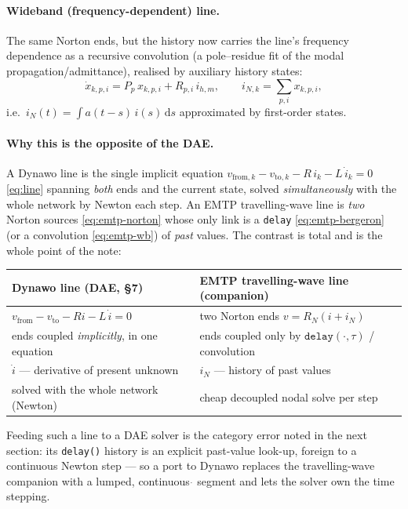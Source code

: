 \documentclass[11pt]{article}
\newcommand{\dd}{\mathrm{d}}
\begin{document}
\paragraph{Wideband (frequency-dependent) line.} The same Norton ends, but the
history now carries the line's frequency dependence as a recursive convolution
(a pole--residue fit of the modal propagation/admittance), realised by auxiliary
history states:
\begin{equation}
\dot x_{k,p,i}=P_{p}\,x_{k,p,i}+R_{p,i}\,i_{h,m},
\qquad
i_{N,k}=\sum_{p,i} x_{k,p,i},
\label{eq:emtp-wb}
\end{equation}
i.e.\ $i_N(t)=\int a(t-s)\,i(s)\,\dd s$ approximated by first-order states.

\paragraph{Why this is the opposite of the DAE.} A Dynawo line is the single
implicit equation $v_{\mathrm{from},k}-v_{\mathrm{to},k}-R\,i_k-L\,\dot i_k=0$
\eqref{eq:line} spanning \emph{both} ends and the current state, solved
\emph{simultaneously} with the whole network by Newton each step. An EMTP
travelling-wave line is \emph{two} Norton sources \eqref{eq:emtp-norton} whose
only link is a \texttt{delay} \eqref{eq:emtp-bergeron} (or a convolution
\eqref{eq:emtp-wb}) of \emph{past} values. The contrast is total and is the whole
point of the note:

\begin{center}\renewcommand{\arraystretch}{1.25}
\begin{tabular}{>{\raggedright\arraybackslash}p{}>{\raggedright\arraybackslash}p{}}
\toprule
\textbf{Dynawo line (DAE, \S7)} & \textbf{EMTP travelling-wave line (companion)} \\
\midrule
$v_{\mathrm{from}}-v_{\mathrm{to}}-R i-L\,\dot i=0$ & two Norton ends $v=R_N(i+i_N)$ \\
ends coupled \emph{implicitly}, in one equation & ends coupled only by $\texttt{delay}(\cdot,\tau)$ / convolution \\
$\dot i$ --- derivative of present unknown & $i_N$ --- history of past values \\
solved with the whole network (Newton) & cheap decoupled nodal solve per step \\
\bottomrule
\end{tabular}
\end{center}

Feeding such a line to a DAE solver is the category error noted in the next
section: its \texttt{delay()} history is an explicit past-value look-up, foreign
to a continuous Newton step --- so a port to Dynawo replaces the travelling-wave
companion with a lumped, continuous $\dot{}$ segment and lets the solver own the
time stepping.
\end{document}
